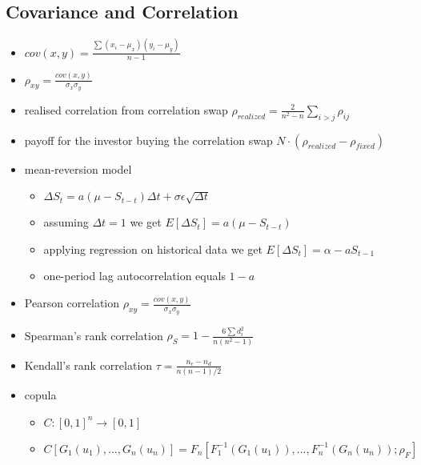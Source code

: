 \subsection{Covariance and Correlation}
\begin{itemize}
	\item $cov(x,y) = \frac{\sum(x_i - \mu_x)(y_i - \mu_y)}{n - 1}$
	\item $\rho_{xy} = \frac{cov(x,y)}{\sigma_x \sigma_y}$
	\item realised correlation from correlation swap $\rho_{realized} = \frac{2}{n^2 - n}\sum_{i > j}\rho_{ij}$
	\item payoff for the investor buying the correlation swap $N \cdot (\rho_{realized} - \rho_{fixed})$
	\item mean-reversion model
	\begin{itemize}
		\item $\Delta S_t = a(\mu - S_{t - t}) \Delta t + \sigma \epsilon \sqrt{\Delta t}$
		\item assuming $\Delta t = 1$ we get $E[\Delta S_t] = a(\mu - S_{t - t})$
		\item applying regression on historical data we get $E[\Delta S_t] = \alpha - a S_{t - 1}$
		\item one-period lag autocorrelation equals $1 - a$
	\end{itemize}
	\item Pearson correlation $\rho_{xy} = \frac{cov(x,y)}{\sigma_x \sigma_y}$
	\item Spearman's rank correlation $\rho_S = 1 - \frac{6 \sum d_i^2}{n(n^2 - 1)}$
	\item Kendall's rank correlation $\tau = \frac{n_c - n_d}{n(n - 1) / 2}$
	\item copula
	\begin{itemize}
		\item $C: [0, 1]^n \rightarrow [0, 1]$
		\item $C[G_1(u_1), ..., G_n(u_n)] = F_n[F_1^{-1}(G_1(u_1)), ..., F_n^{-1}(G_n(u_n)); \rho_F]$
	\end{itemize}
\end{itemize}

